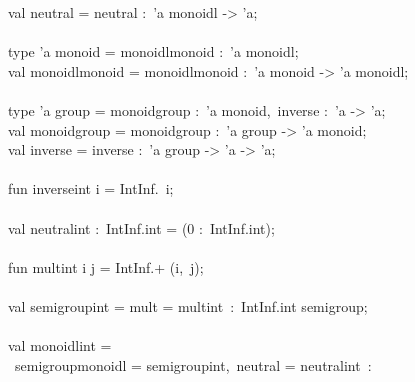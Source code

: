 \begin{isabellebody}
\begin{isamarkuptext}
\hspace*{0pt}val neutral = {}neutral :~'a monoidl -> 'a;\\
\hspace*{0pt}\\
\hspace*{0pt}type 'a monoid = {}monoidl{}monoid :~'a monoidl{};\\
\hspace*{0pt}val monoidl{}monoid = {}monoidl{}monoid :~'a monoid -> 'a monoidl;\\
\hspace*{0pt}\\
\hspace*{0pt}type 'a group = {}monoid{}group :~'a monoid,~inverse :~'a -> 'a{};\\
\hspace*{0pt}val monoid{}group = {}monoid{}group :~'a group -> 'a monoid;\\
\hspace*{0pt}val inverse = {}inverse :~'a group -> 'a -> 'a;\\
\hspace*{0pt}\\
\hspace*{0pt}fun inverse{}int i = IntInf.{}~i;\\
\hspace*{0pt}\\
\hspace*{0pt}val neutral{}int :~IntInf.int = (0 :~IntInf.int);\\
\hspace*{0pt}\\
\hspace*{0pt}fun mult{}int i j = IntInf.+ (i,~j);\\
\hspace*{0pt}\\
\hspace*{0pt}val semigroup{}int = {}mult = mult{}int{}~:~IntInf.int semigroup;\\
\hspace*{0pt}\\
\hspace*{0pt}val monoidl{}int =\\
\hspace*{0pt} ~{}semigroup{}monoidl = semigroup{}int,~neutral = neutral{}int{}~:\\

\end{isamarkuptext}
\end{isabellebody}
